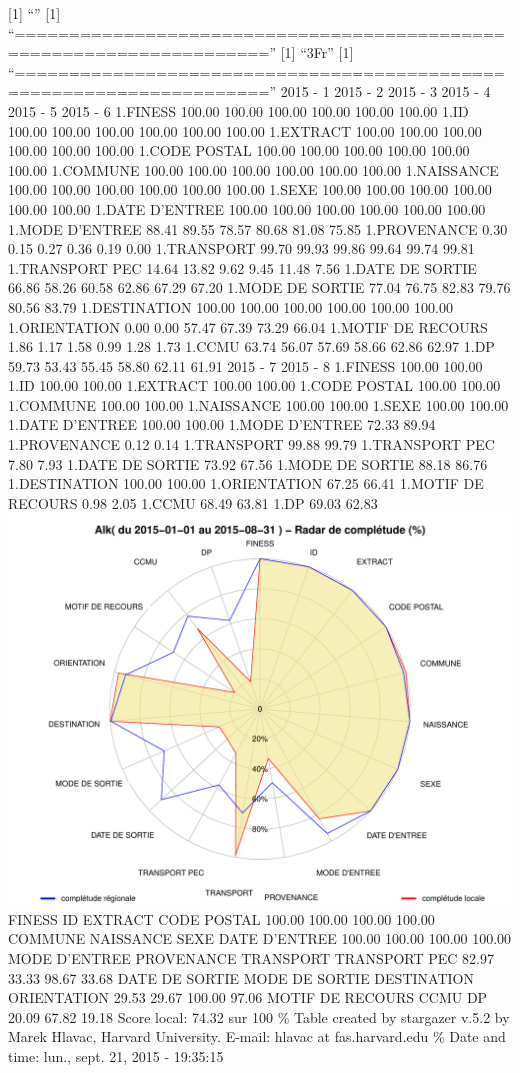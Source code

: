 \documentclass[]{article}
\begin{document}
{[}1{]} ``'' {[}1{]}
``=====================================================================''
{[}1{]} ``3Fr'' {[}1{]}
``=====================================================================''
2015 - 1 2015 - 2 2015 - 3 2015 - 4 2015 - 5 2015 - 6 1.FINESS 100.00
100.00 100.00 100.00 100.00 100.00 1.ID 100.00 100.00 100.00 100.00
100.00 100.00 1.EXTRACT 100.00 100.00 100.00 100.00 100.00 100.00 1.CODE
POSTAL 100.00 100.00 100.00 100.00 100.00 100.00 1.COMMUNE 100.00 100.00
100.00 100.00 100.00 100.00 1.NAISSANCE 100.00 100.00 100.00 100.00
100.00 100.00 1.SEXE 100.00 100.00 100.00 100.00 100.00 100.00 1.DATE
D'ENTREE 100.00 100.00 100.00 100.00 100.00 100.00 1.MODE D'ENTREE 88.41
89.55 78.57 80.68 81.08 75.85 1.PROVENANCE 0.30 0.15 0.27 0.36 0.19 0.00
1.TRANSPORT 99.70 99.93 99.86 99.64 99.74 99.81 1.TRANSPORT PEC 14.64
13.82 9.62 9.45 11.48 7.56 1.DATE DE SORTIE 66.86 58.26 60.58 62.86
67.29 67.20 1.MODE DE SORTIE 77.04 76.75 82.83 79.76 80.56 83.79
1.DESTINATION 100.00 100.00 100.00 100.00 100.00 100.00 1.ORIENTATION
0.00 0.00 57.47 67.39 73.29 66.04 1.MOTIF DE RECOURS 1.86 1.17 1.58 0.99
1.28 1.73 1.CCMU 63.74 56.07 57.69 58.66 62.86 62.97 1.DP 59.73 53.43
55.45 58.80 62.11 61.91 2015 - 7 2015 - 8 1.FINESS 100.00 100.00 1.ID
100.00 100.00 1.EXTRACT 100.00 100.00 1.CODE POSTAL 100.00 100.00
1.COMMUNE 100.00 100.00 1.NAISSANCE 100.00 100.00 1.SEXE 100.00 100.00
1.DATE D'ENTREE 100.00 100.00 1.MODE D'ENTREE 72.33 89.94 1.PROVENANCE
0.12 0.14 1.TRANSPORT 99.88 99.79 1.TRANSPORT PEC 7.80 7.93 1.DATE DE
SORTIE 73.92 67.56 1.MODE DE SORTIE 88.18 86.76 1.DESTINATION 100.00
100.00 1.ORIENTATION 67.25 66.41 1.MOTIF DE RECOURS 0.98 2.05 1.CCMU
68.49 63.81 1.DP 69.03 62.83
\includegraphics{completude_files/figure-latex/finess-8.pdf} FINESS ID
EXTRACT CODE POSTAL 100.00 100.00 100.00 100.00 COMMUNE NAISSANCE SEXE
DATE D'ENTREE 100.00 100.00 100.00 100.00 MODE D'ENTREE PROVENANCE
TRANSPORT TRANSPORT PEC 82.97 33.33 98.67 33.68 DATE DE SORTIE MODE DE
SORTIE DESTINATION ORIENTATION 29.53 29.67 100.00 97.06 MOTIF DE RECOURS
CCMU DP 20.09 67.82 19.18 Score local: 74.32 sur 100 \% Table created by
stargazer v.5.2 by Marek Hlavac, Harvard University. E-mail: hlavac at
fas.harvard.edu \% Date and time: lun., sept. 21, 2015 - 19:35:15
\end{document}
